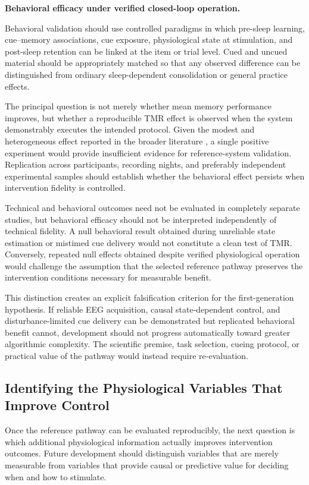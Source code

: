 \noindent\textbf{Behavioral efficacy under verified closed-loop operation.}

Behavioral validation should use controlled paradigms in which pre-sleep
learning, cue--memory associations, cue exposure, physiological state at
stimulation, and post-sleep retention can be linked at the item or trial level.
Cued and uncued material should be appropriately matched so that any observed
difference can be distinguished from ordinary sleep-dependent consolidation or
general practice effects.

The principal question is not merely whether mean memory performance improves,
but whether a reproducible TMR effect is observed when the system demonstrably
executes the intended protocol. Given the modest and heterogeneous effect
reported in the broader literature \citep{hu2020promoting}, a single positive
experiment would provide insufficient evidence for reference-system validation.
Replication across participants, recording nights, and preferably independent
experimental samples should establish whether the behavioral effect persists
when intervention fidelity is controlled.

Technical and behavioral outcomes need not be evaluated in completely separate
studies, but behavioral efficacy should not be interpreted independently of
technical fidelity. A null behavioral result obtained during unreliable state
estimation or mistimed cue delivery would not constitute a clean test of TMR.
Conversely, repeated null effects obtained despite verified physiological
operation would challenge the assumption that the selected reference pathway
preserves the intervention conditions necessary for measurable benefit.

This distinction creates an explicit falsification criterion for the
first-generation hypothesis. If reliable EEG acquisition, causal
state-dependent control, and disturbance-limited cue delivery can be
demonstrated but replicated behavioral benefit cannot, development should not
progress automatically toward greater algorithmic complexity. The scientific
premise, task selection, cueing protocol, or practical value of the pathway
would instead require re-evaluation.


\subsection{Identifying the Physiological Variables That Improve Control}

Once the reference pathway can be evaluated reproducibly, the next question is
which additional physiological information actually improves intervention
outcomes. Future development should distinguish variables that are merely
measurable from variables that provide causal or predictive value for deciding
when and how to stimulate.

